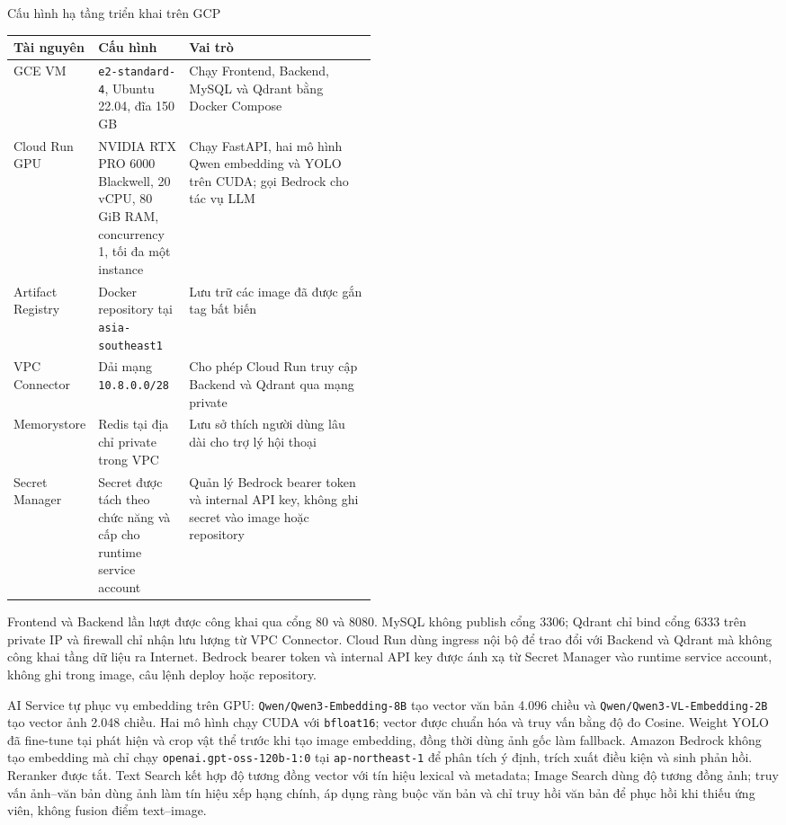 \clearpage
\begin{breakabletable}
\centering
\caption{Cấu hình hạ tầng triển khai trên GCP}
\label{tab:gcp-resource-config}
\begin{tabularx}{\linewidth}{|p{0.22\linewidth}|p{0.25\linewidth}|X|}
\hline
\textbf{Tài nguyên} & \textbf{Cấu hình} & \textbf{Vai trò} \\ \hline
GCE VM & \texttt{e2-standard-4}, Ubuntu 22.04, đĩa 150 GB & Chạy Frontend, Backend, MySQL và Qdrant bằng Docker Compose \\ \hline
Cloud Run GPU & NVIDIA RTX PRO 6000 Blackwell, 20 vCPU, 80 GiB RAM, concurrency 1, tối đa một instance & Chạy FastAPI, hai mô hình Qwen embedding và YOLO trên CUDA; gọi Bedrock cho tác vụ LLM \\ \hline
Artifact Registry & Docker repository tại \texttt{asia-southeast1} & Lưu trữ các image đã được gắn tag bất biến \\ \hline
VPC Connector & Dải mạng \texttt{10.8.0.0/28} & Cho phép Cloud Run truy cập Backend và Qdrant qua mạng private \\ \hline
Memorystore & Redis tại địa chỉ private trong VPC & Lưu sở thích người dùng lâu dài cho trợ lý hội thoại \\ \hline
Secret Manager & Secret được tách theo chức năng và cấp cho runtime service account & Quản lý Bedrock bearer token và internal API key, không ghi secret vào image hoặc repository \\ \hline
\end{tabularx}
\end{breakabletable}

Frontend và Backend lần lượt được công khai qua cổng 80 và 8080. MySQL không publish cổng 3306; Qdrant chỉ bind cổng 6333 trên private IP và firewall chỉ nhận lưu lượng từ VPC Connector. Cloud Run dùng ingress nội bộ để trao đổi với Backend và Qdrant mà không công khai tầng dữ liệu ra Internet. Bedrock bearer token và internal API key được ánh xạ từ Secret Manager vào runtime service account, không ghi trong image, câu lệnh deploy hoặc repository.

AI Service tự phục vụ embedding trên GPU: \texttt{Qwen/Qwen3-Embedding-8B} tạo vector văn bản 4.096 chiều và \texttt{Qwen/Qwen3-VL-Embedding-2B} tạo vector ảnh 2.048 chiều. Hai mô hình chạy CUDA với \texttt{bfloat16}; vector được chuẩn hóa và truy vấn bằng độ đo Cosine. Weight YOLO đã fine-tune tại  phát hiện và crop vật thể trước khi tạo image embedding, đồng thời dùng ảnh gốc làm fallback. Amazon Bedrock không tạo embedding mà chỉ chạy \texttt{openai.gpt-oss-120b-1:0} tại \texttt{ap-northeast-1} để phân tích ý định, trích xuất điều kiện và sinh phản hồi. Reranker được tắt. Text Search kết hợp độ tương đồng vector với tín hiệu lexical và metadata; Image Search dùng độ tương đồng ảnh; truy vấn ảnh--văn bản dùng ảnh làm tín hiệu xếp hạng chính, áp dụng ràng buộc văn bản và chỉ truy hồi văn bản để phục hồi khi thiếu ứng viên, không fusion điểm text--image.

